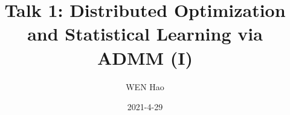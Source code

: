 \usepackage{empheq}
\usepackage{cancel}




\title[Boyd\\Distributed ADMM]{Talk 1: Distributed Optimization and Statistical Learning via ADMM (I)}
\date{2021-4-29}
\author[]{WEN Hao}




\setlength{\belowdisplayskip}{5pt} \setlength{\belowdisplayshortskip}{5pt}
\setlength{\abovedisplayskip}{5pt} \setlength{\abovedisplayshortskip}{5pt}


\begin{frame}
\titlepage %
\end{frame}


\begin{frame}
\tableofcontents %
\end{frame}


